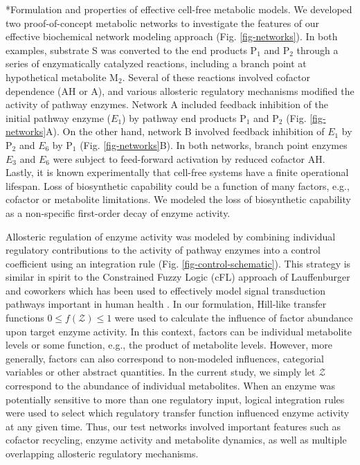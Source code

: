 \documentclass[12pt]{article}
\makeatletter
\renewcommand\subsection{\@startsection
	{subsection}{2}{0mm}
	{-0.05in}
	{-0.5\baselineskip}
	{\normalfont\normalsize\bfseries}}
\makeatother
\begin{document}
\subsection*{Formulation and properties of effective cell-free metabolic models.}
We developed two proof-of-concept metabolic networks to investigate the features of our effective biochemical network modeling approach (Fig. \ref{fig-networks}). 
In both examples, substrate S was converted to the end products P$_{1}$ and P$_{2}$ through a series of enzymatically catalyzed reactions, including a branch point at hypothetical metabolite M$_{2}$. 
Several of these reactions involved cofactor dependence (AH or A), and various allosteric regulatory mechanisms modified the activity of pathway enzymes. 
Network A included feedback inhibition of the initial pathway enzyme ($E_{1}$) by pathway end products P$_{1}$ and P$_{2}$ (Fig. \ref{fig-networks}A). 
On the other hand, network B involved feedback inhibition of $E_{1}$ by P$_{2}$ and $E_{6}$ by P$_{1}$ (Fig. \ref{fig-networks}B). 
In both networks, branch point enzymes $E_{3}$ and $E_{6}$ were subject to feed-forward activation by reduced cofactor AH. 
Lastly, it is known experimentally that cell-free systems have a finite operational lifespan. 
Loss of biosynthetic capability could be a function of many factors, e.g., cofactor or metabolite limitations. 
We modeled the loss of biosynthetic capability as a non-specific first-order decay of enzyme activity.

Allosteric regulation of enzyme activity was modeled by combining individual regulatory contributions to the activity of pathway enzymes into a control coefficient using an integration rule (Fig. \ref{fig-control-schematic}).  
This strategy is similar in spirit to the Constrained Fuzzy Logic (cFL) approach of Lauffenburger and coworkers which has been used to effectively model signal transduction pathways important in human health \citep{Morris:2011aa}. 
In our formulation, Hill-like transfer functions $0 \leq f\left(\mathcal{Z}\right) \leq 1$ were used to calculate the influence of factor abundance upon target enzyme activity. 
In this context, factors can be individual metabolite levels or some function, e.g., the product of metabolite levels. 
However, more generally, factors can also correspond to non-modeled influences, categorial variables or other abstract quantities. 
In the current study, we simply let $\mathcal{Z}$ correspond to the abundance of individual metabolites. 
When an enzyme was potentially sensitive to more than one regulatory input, logical integration rules were used to select which regulatory transfer function influenced enzyme activity at any given time. 
Thus, our test networks involved important features such as cofactor recycling, enzyme activity and metabolite dynamics, as well as multiple overlapping allosteric regulatory mechanisms.  
\end{document}
